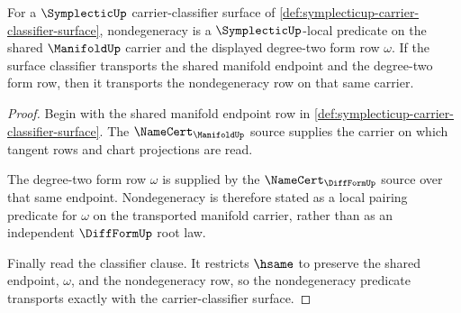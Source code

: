 \begin{theorem}
\label{thm:symplecticup-nondegeneracy-obligation}
For a $\SymplecticUp$ carrier-classifier surface of \autoref{def:symplecticup-carrier-classifier-surface}, nondegeneracy is a $\SymplecticUp$-local predicate on the shared $\ManifoldUp$ carrier and the displayed degree-two form row $\omega$. If the surface classifier transports the shared manifold endpoint and the degree-two form row, then it transports the nondegeneracy row on that same carrier.
\end{theorem}
\begin{proof}
Begin with the shared manifold endpoint row in \autoref{def:symplecticup-carrier-classifier-surface}. The $\NameCert_{\ManifoldUp}$ source supplies the carrier on which tangent rows and chart projections are read.

The degree-two form row $\omega$ is supplied by the $\NameCert_{\DiffFormUp}$ source over that same endpoint. Nondegeneracy is therefore stated as a local pairing predicate for $\omega$ on the transported manifold carrier, rather than as an independent $\DiffFormUp$ root law.

Finally read the classifier clause. It restricts $\hsame$ to preserve the shared endpoint, $\omega$, and the nondegeneracy row, so the nondegeneracy predicate transports exactly with the carrier-classifier surface.
\end{proof}

